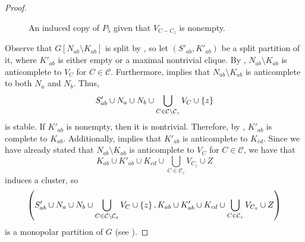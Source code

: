 \begin{proof}
\begin{figure}[htb!]
        \caption{An induced copy of $P_5$ given that $V_{C-C_z}$ is nonempty.}
        \label{fig:empty_component}
    \end{figure}
    
    Observe that $G[N_{ab} \setminus K_{ab}]$ is split by
    , so let $(S'_{ab},K'_{ab})$ be a split partition
    of it, where $K'_{ab}$ is either empty or a maximal nontrivial clique. By
    , $N_{ab}\setminus K_{ab}$ is anticomplete to $V_C$
    for $C\in \mathcal{C}$. Furthermore,  implies
    that $N_{ab}\setminus K_{ab}$ is anticomplete to both $N_a$ and $N_b$. Thus,
    \[
        S'_{ab} \cup N_a \cup N_b \cup \bigcup_{C\in\mathcal{C}\setminus 
        \mathcal{C}_z} V_C \cup  \left\{z\right\}
    \]
    is stable. If $K'_{ab}$ is nonempty, then it is nontrivial. Therefore, by
    , $K'_{ab}$ is complete to $K_{ab}$. Additionally,
     implies that $K'_{ab}$ is anticomplete to
    $K_{cd}$. Since we have already stated that $N_{ab}\setminus K_{ab}$ is
    anticomplete to $V_C$ for $C\in \mathcal{C}$, we have that
    \[
        K_{ab} \cup K'_{ab} \cup K_{cd} \cup \bigcup_{C\in \mathcal{C}_z} 
        V_{C_z} \cup Z
    \]
    induces a cluster, so
    \[
        \left(S'_{ab} \cup N_a \cup N_b \cup \bigcup_{C\in\mathcal{C}\setminus 
        \mathcal{C}_z} V_C \cup  \left\{z\right\} , 
        K_{ab} \cup K'_{ab} \cup K_{cd} \cup \bigcup_{C\in \mathcal{C}_z} 
        V_{C_z} \cup Z\right)
    \]
    is a monopolar partition of $G$ (see
    ).


\end{proof}
